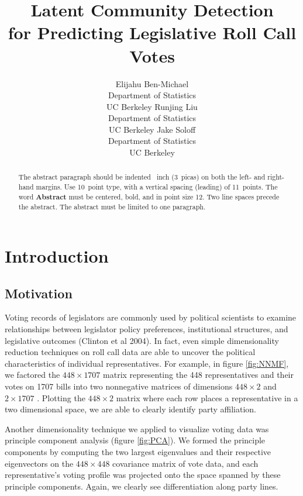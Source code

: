 \documentclass{article}
\title{Latent Community Detection \\
for Predicting Legislative Roll Call Votes}
\author{
  Elijahu Ben-Michael \\
  Department of Statistics\\
  UC Berkeley
   \And
  Runjing Liu \\
  Department of Statistics\\
  UC Berkeley
   \And
  Jake Soloff \\
  Department of Statistics\\
  UC Berkeley
}
\begin{document}

\maketitle

\vspace{-1em}

\begin{abstract}
  The abstract paragraph should be indented ~inch
  (3~picas) on both the left- and right-hand margins. Use 10~point
  type, with a vertical spacing (leading) of 11~points.  The word
  \textbf{Abstract} must be centered, bold, and in point size 12. Two
  line spaces precede the abstract. The abstract must be limited to
  one paragraph.
\end{abstract}

\section{Introduction}
\label{introduction}




\subsection{Motivation} 

Voting records of legislators are commonly used by political scientists to examine relationships between legislator policy preferences, institutional structures, and legislative outcomes (Clinton et al 2004). In fact, even simple dimensionality reduction techniques on roll call data are able to uncover the political characteristics of individual representatives. For example, in figure \ref{fig:NNMF}, we factored the $448\times1707$ matrix representing the 448 representatives and their votes on 1707 bills into two nonnegative matrices of dimensions $448\times 2$ and $2\times 1707$ . Plotting the  $448\times 2$ matrix where each row places a representative in a two dimensional space, we are able to clearly identify party affiliation. \par

Another dimensionality technique we applied to visualize voting data was principle component analysis (figure \ref{fig:PCA}). We formed the principle components by computing the two largest eigenvalues and their respective eigenvectors on the $448\times 448$ covariance matrix of vote data, and each representative's voting profile was projected onto the space spanned by these principle components. Again, we clearly see differentiation along party lines. 
\end{document}
